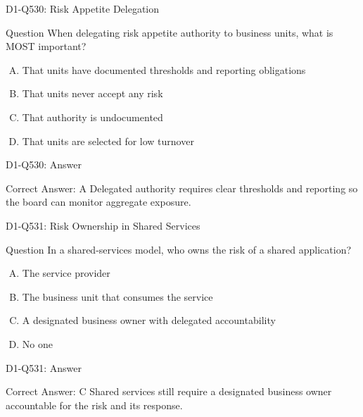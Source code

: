 \documentclass{beamer}
\begin{document}
\begin{frame}{D1-Q530: Risk Appetite Delegation}
	\begin{block}{Question}
		When delegating risk appetite authority to business units, what is MOST important?
	\end{block}
	\begin{enumerate}[(A)]
		\item That units have documented thresholds and reporting obligations
		\item That units never accept any risk
		\item That authority is undocumented
		\item That units are selected for low turnover
	\end{enumerate}
\end{frame}
\begin{frame}{D1-Q530: Answer}
	\begin{block}{Correct Answer: A}
		Delegated authority requires clear thresholds and reporting so the board can monitor aggregate exposure.
	\end{block}
\end{frame}

\begin{frame}{D1-Q531: Risk Ownership in Shared Services}
	\begin{block}{Question}
		In a shared-services model, who owns the risk of a shared application?
	\end{block}
	\begin{enumerate}[(A)]
		\item The service provider
		\item The business unit that consumes the service
		\item A designated business owner with delegated accountability
		\item No one
	\end{enumerate}
\end{frame}
\begin{frame}{D1-Q531: Answer}
	\begin{block}{Correct Answer: C}
		Shared services still require a designated business owner accountable for the risk and its response.
	\end{block}
\end{frame}
\end{document}
